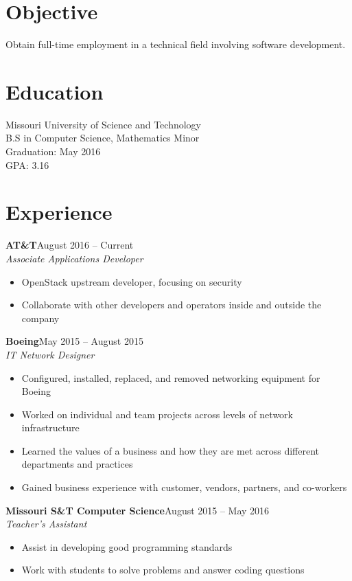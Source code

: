 \documentclass[margin]{res}
\begin{document}
  \begin{resume} 
    \section{Objective} 
      Obtain full-time employment in a technical field involving software development.

    \section{Education}
      Missouri University of Science and Technology \\ 
      B.S in Computer Science, Mathematics Minor \\
      Graduation: May 2016 \\
      GPA: 3.16

	\section{Experience}
	   \textbf{AT\&T}\hfill August 2016 -- Current\\
       \textit{Associate Applications Developer} 
       \begin{itemize} \itemsep -1pt  %
         \item OpenStack upstream developer, focusing on security
         \item Collaborate with other developers and operators inside and outside the company
       \end{itemize}
	
       \textbf{Boeing}\hfill May 2015 -- August 2015 \\
       \textit{IT Network Designer}\hfill 
       \begin{itemize} \itemsep -1pt  %
         \item Configured, installed, replaced, and removed networking equipment for Boeing
         \item Worked on individual and team projects across levels of network infrastructure 
         \item Learned the values of a business and how they are met across different departments and practices
         \item Gained business experience with customer, vendors, partners, and co-workers
       \end{itemize}

	   \textbf{Missouri S\&T Computer Science}\hfill August 2015 -- May 2016\\
       \textit{Teacher's Assistant} 
       \begin{itemize} \itemsep -1pt  %
         \item Assist in developing good programming standards
         \item Work with students to solve problems and answer coding questions
       \end{itemize}


\end{resume}
\end{document}
